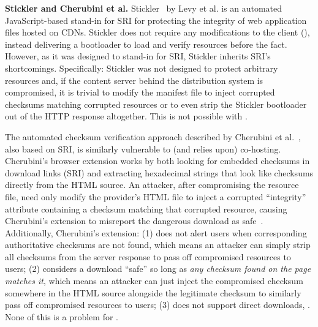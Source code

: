 \noindent\textbf{Stickler and Cherubini et al.} Stickler~\cite{Stickler} by Levy
et al. is an automated JavaScript-based stand-in for SRI for protecting the
integrity of web application files hosted on CDNs. Stickler does not require any
modifications to the client (), instead delivering a bootloader
to load and verify resources before the fact. However, as it was designed to
stand-in for SRI, Stickler inherits SRI's shortcomings. Specifically: Stickler
was not designed to protect arbitrary resources and, if the content server
behind the distribution system is compromised, it is trivial to modify the
manifest file to inject corrupted checksums matching corrupted resources or to
even strip the Stickler bootloader out of the HTTP response altogether. This is
not possible with \SYSTEM{}.

The automated checksum verification approach described by Cherubini et
al.~\cite{Cherubini}, also based on SRI, is similarly vulnerable to (and relies
upon) co-hosting. Cherubini's browser extension works by both looking for
embedded checksums in download links (SRI) and extracting hexadecimal strings
that look like checksums directly from the HTML source. An attacker, after
compromising the resource file, need only modify the provider's HTML file to
inject a corrupted ``integrity'' attribute containing a checksum matching that
corrupted resource, causing Cherubini's extension to misreport the dangerous
download as safe~\cite{Cherubini}. Additionally, Cherubini's extension: (1) does
not alert users when corresponding authoritative checksums are not found, which
means an attacker can simply strip all checksums from the server response to
pass off compromised resources to users; (2) considers a download ``safe'' so
long as \emph{any checksum found on the page matches it}, which means an
attacker can just inject the compromised checksum somewhere in the HTML source
alongside the legitimate checksum to similarly pass off compromised resources to
users; (3) does not support direct downloads, . None of
this is a problem for \SYSTEM{}.
